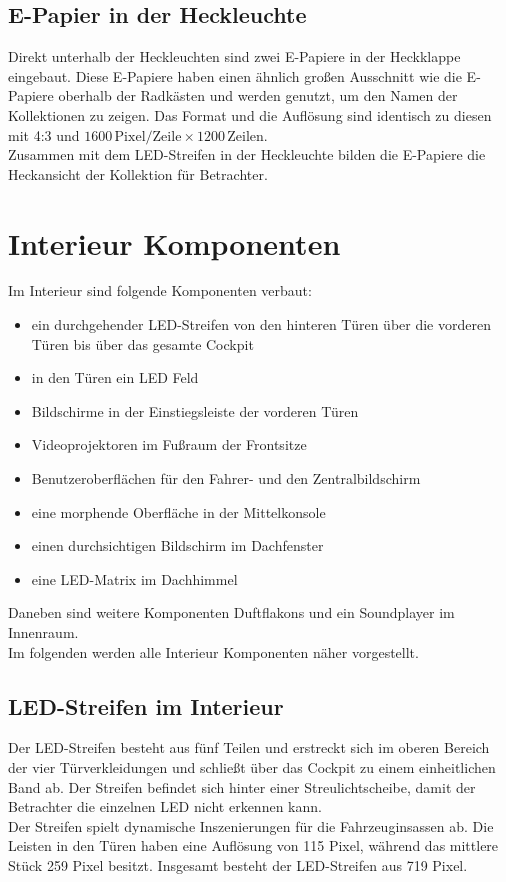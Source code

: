 \subsection{E-Papier in der Heckleuchte}
Direkt unterhalb der Heckleuchten sind zwei E-Papiere in der Heckklappe eingebaut.
Diese E-Papiere haben einen ähnlich großen Ausschnitt wie die E-Papiere oberhalb der Radkästen und werden genutzt, um den Namen der Kollektionen zu zeigen. Das Format und die Auflösung sind identisch zu diesen mit 4:3 und $ 1600 \,\mathrm{Pixel}/\mathrm{Zeile} \times 1200\,\mathrm{Zeilen} $.\\
Zusammen mit dem LED-Streifen in der Heckleuchte bilden die E-Papiere die Heckansicht der Kollektion für Betrachter.
\section{Interieur Komponenten}
Im Interieur sind folgende Komponenten verbaut:
\begin{itemize}
	\item ein durchgehender LED-Streifen von den hinteren Türen über die vorderen Türen bis über das gesamte Cockpit
	\item in den Türen ein LED Feld
	\item Bildschirme in der Einstiegsleiste der vorderen Türen
	\item Videoprojektoren im Fußraum der Frontsitze
	\item Benutzeroberflächen für den Fahrer- und den Zentralbildschirm
	\item eine morphende Oberfläche in der Mittelkonsole
	\item einen durchsichtigen Bildschirm im Dachfenster
	\item eine LED-Matrix im Dachhimmel
\end{itemize}
Daneben sind weitere Komponenten Duftflakons und ein Soundplayer im Innenraum. \\
Im folgenden werden alle Interieur Komponenten näher vorgestellt.
\subsection{LED-Streifen im Interieur}
Der LED-Streifen besteht aus fünf Teilen und erstreckt sich im oberen Bereich der vier Türverkleidungen und schließt über das Cockpit zu einem einheitlichen Band ab. Der Streifen befindet sich hinter einer Streulichtscheibe, damit der Betrachter die einzelnen LED nicht erkennen kann. \\
Der Streifen spielt dynamische Inszenierungen für die Fahrzeuginsassen ab.
Die Leisten in den Türen haben eine Auflösung von 115 Pixel, während das mittlere Stück 259 Pixel besitzt. Insgesamt besteht der LED-Streifen aus 719 Pixel.
